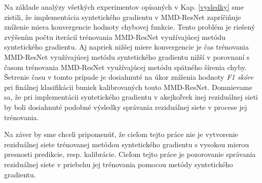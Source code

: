 Na základe analýzy všetkých experimentov opísaných v Kap. \ref{vysledky} sme zistili, že implementácia syntetického gradientu v MMD-ResNet zapríčiňuje zníženie miera konvergencie hodnoty chybovej funkcie. Tento problém je riešený zvýšením počtu iterácií trénovania MMD-ResNet využívajúcej metódu syntetického gradientu. Aj napriek nižšej miere konvergencie je čas trénovania MMD-ResNet využívajúcej metódu syntetického gradientu nižší v porovnaní s časom trénovania MMD-ResNet využívajúcej metódu spätného šírenia chyby. Šetrenie času v tomto prípade je dosiahnuté na úkor zníženia hodnoty \textit{F1 skóre} pri finálnej klasifikácii buniek kalibrovaných touto MMD-ResNet. Domnievame sa, že pri implementácii syntetického gradientu v akejkoľvek inej reziduálnej sieti by boli dosiahnuté podobné výsledky správania reziduálnej siete v procese jej trénovania.

Na záver by sme chceli pripomenúť, že cieľom tejto práce nie je vytvorenie reziduálnej siete trénovanej metódou syntetického gradientu s vysokou mierou presnosti predikcie, resp. kalibrácie. Cieľom tejto práce je pozorovanie správania reziduálnej siete v priebehu jej trénovania pomocou metódy syntetického gradientu.